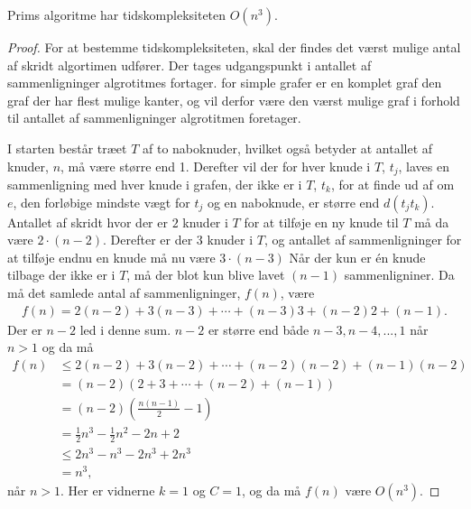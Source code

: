 \begin{thm}
	Prims algoritme har tidskompleksiteten $O (n^3)$.
	\label{prim_kompl}
\end{thm}
\begin{proof}
	For at bestemme tidskompleksiteten, skal der findes det værst mulige antal af skridt algortimen udfører.
	Der tages udgangspunkt i antallet af sammenligninger algrotitmes fortager.
	for simple grafer er en komplet graf den graf der har flest mulige kanter, og vil derfor være den værst mulige graf i forhold til antallet af sammenligninger algrotitmen foretager.

	I starten består træet $T$ af to naboknuder, hvilket også betyder at antallet af knuder, $n$, må være større end 1.
	Derefter vil der for hver knude i $T$, $t_j$, laves en sammenligning med hver knude i grafen, der ikke er i $T$, $t_k$, for at finde ud af om $e$, den forløbige mindste vægt for $t_j$ og en naboknude, er større end $d(t_j t_k)$.
	Antallet af skridt hvor der er $2$ knuder i $T$ for at tilføje en ny knude til $T$ må da være $2 \cdot (n - 2)$.
	Derefter er der $3$ knuder i $T$, og antallet af sammenligninger for at tilføje endnu en knude må nu være $3 \cdot (n - 3)$
	Når der kun er én knude tilbage der ikke er i $T$, må der blot kun blive lavet $(n-1)$ sammenligniner.
	Da må det samlede antal af sammenligninger, $f(n)$, være
	\begin{align*}
		f(n) = 2 (n-2) + 3(n-3) + \dotsb + (n-3) 3 + (n-2) 2 + (n -1).
	\end{align*}
	Der er $n -2$ led i denne sum. $n-2$ er større end både $n-3, n-4, ..., 1$ når $n > 1$ og da må
	\begin{align*}
		f(n)
		&\leq 2 (n-2) + 3 (n-2) + \dotsb + (n-2) (n-2) + (n-1) (n-2) \\
		&= (n-2) \left( 2 + 3 + \dotsb + (n-2) + (n-1) \right) \\
		&= (n-2) \left( \frac{n(n-1)}{2} - 1 \right) \\
		&= \frac{1}{2} n^3 - \frac{1}{2} n^2 - 2n + 2 \\
		&\leq 2n^3 - n^3 - 2n^3 + 2n^3 \\
		&= n^3,
	\end{align*}
	når $n > 1$. Her er vidnerne $k=1$ og $C=1$, og da må $f(n)$ være $O(n^3)$.
\end{proof}
